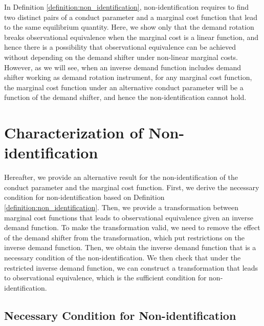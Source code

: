 \documentclass[11pt, a4paper]{article}
\theoremstyle{remark}
\begin{document}
In Definition \ref{definition:non_identification}, non-identification requires to find two distinct pairs of a conduct parameter and a marginal cost function that lead to the same equilibrium quantity.
Here, we show only that the demand rotation breaks observational equivalence when the marginal cost is a linear function, and hence there is a possibility that observational equivalence can be achieved without depending on the demand shifter under non-linear marginal costs.
However, as we will see, when an inverse demand function includes demand shifter working as demand rotation instrument, for any marginal cost function, the marginal cost function under an alternative conduct parameter will be a function of the demand shifter, and hence the non-identification cannot hold.


\section{Characterization of Non-identification}\label{sec:nonidentification_characterization}

Hereafter, we provide an alternative result for the non-identification of the conduct parameter and the marginal cost function. 
First, we derive the necessary condition for non-identification based on Definition \ref{definition:non_identification}.
Then, we provide a transformation between marginal cost functions that leads to observational equivalence given an inverse demand function.
To make the transformation valid, we need to remove the effect of the demand shifter from the transformation, which put restrictions on the inverse demand function.
Then, we obtain the inverse demand function that is a necessary condition of the non-identification.
We then check that under the restricted inverse demand function, we can construct a transformation that leads to observational equivalence, which is the sufficient condition for non-identification.


\subsection{Necessary Condition for Non-identification}\label{subsec:necessary_condition_nonidentification}
\end{document}
